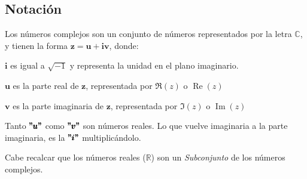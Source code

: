 \subsection{Notación}

Los números complejos son un conjunto de números representados por la letra $\mathbb{C}$, y tienen la forma $\pmb{z = u + iv}$, donde:

\begin{addmargin}[2em]{2em} %
    $\pmb{i}$ es igual a $\sqrt{-1}$ y representa la unidad en el plano imaginario.

    $\pmb{u}$ es la parte real de $\pmb{z}$, representada por $\Re(z)$ o $\operatorname{Re}(z)$
    
    $\pmb{v}$ es la parte imaginaria de $\pmb{z}$, representada por $\Im(z)$ o $\operatorname{Im}(z)$
    
    Tanto $\pmb{"u"}$ como $\pmb{"v"}$ son números reales. Lo que vuelve imaginaria a la parte imaginaria, es la $\pmb{"i"}$ multiplicándolo.
\end{addmargin}

Cabe recalcar que los números reales ($\mathbb{R}$) son un \textit{Subconjunto} de los números complejos.

